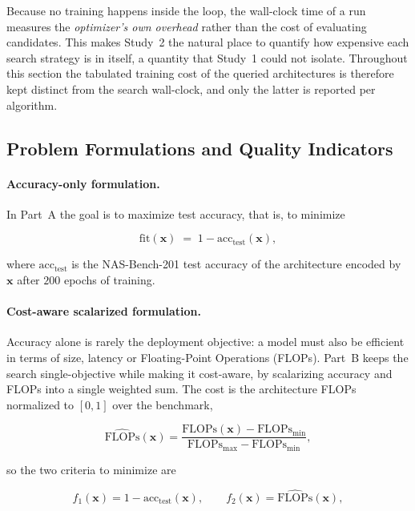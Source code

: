 Because no training happens inside the loop, the wall-clock time of a run measures the \emph{optimizer's own overhead} rather than the cost of evaluating candidates. This makes Study~2 the natural place to quantify how expensive each search strategy is in itself, a quantity that Study~1 could not isolate. Throughout this section the tabulated training cost of the queried architectures is therefore kept distinct from the search wall-clock, and only the latter is reported per algorithm.

\subsection{Problem Formulations and Quality Indicators}
\label{subsec:study2_formulations}

\paragraph{Accuracy-only formulation.}
In Part~A the goal is to maximize test accuracy, that is, to minimize

\begin{equation}
    \mathrm{fit}(\mathbf{x}) \;=\; 1 - \mathrm{acc}_{\mathrm{test}}(\mathbf{x}),
    \label{eq:fitness_study2}
\end{equation}

where $\mathrm{acc}_{\mathrm{test}}$ is the NAS-Bench-201 test accuracy of the architecture encoded by $\mathbf{x}$ after $200$ epochs of training.

\paragraph{Cost-aware scalarized formulation.}
Accuracy alone is rarely the deployment objective: a model must also be efficient in terms of size, latency or Floating-Point Operations (FLOPs). Part~B keeps the search single-objective while making it cost-aware, by scalarizing accuracy and FLOPs into a single weighted sum. The cost is the architecture FLOPs normalized to $[0,1]$ over the benchmark,

\begin{equation}
    \widehat{\mathrm{FLOPs}}(\mathbf{x}) = \frac{\mathrm{FLOPs}(\mathbf{x}) - \mathrm{FLOPs}_{\min}}{\mathrm{FLOPs}_{\max} - \mathrm{FLOPs}_{\min}},
    \label{eq:flops}
\end{equation}

so the two criteria to minimize are

\begin{equation}
    f_1(\mathbf{x}) = 1 - \mathrm{acc}_{\mathrm{test}}(\mathbf{x}), \qquad f_2(\mathbf{x}) = \widehat{\mathrm{FLOPs}}(\mathbf{x}),
    \label{eq:objectives}
\end{equation}

